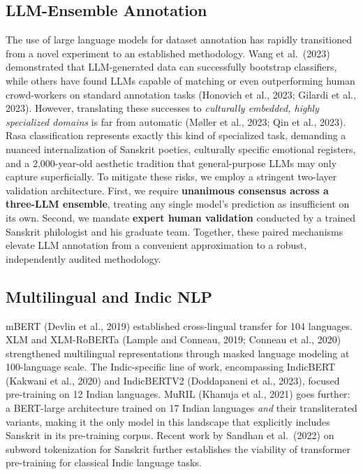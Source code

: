 \documentclass[11pt]{article}
\begin{document}
\subsection{LLM-Ensemble Annotation}

The use of large language models for dataset annotation has rapidly transitioned from a novel experiment to an established methodology. Wang et al.\ (2023) demonstrated that LLM-generated data can successfully bootstrap classifiers, while others have found LLMs capable of matching or even outperforming human crowd-workers on standard annotation tasks (Honovich et al., 2023; Gilardi et al., 2023). However, translating these successes to \emph{culturally embedded, highly specialized domains} is far from automatic (M{\o}ller et al., 2023; Qin et al., 2023). Rasa classification represents exactly this kind of specialized task, demanding a nuanced internalization of Sanskrit poetics, culturally specific emotional registers, and a 2,000-year-old aesthetic tradition that general-purpose LLMs may only capture superficially. To mitigate these risks, we employ a stringent two-layer validation architecture. First, we require \textbf{unanimous consensus across a three-LLM ensemble}, treating any single model's prediction as insufficient on its own. Second, we mandate \textbf{expert human validation} conducted by a trained Sanskrit philologist and his graduate team. Together, these paired mechanisms elevate LLM annotation from a convenient approximation to a robust, independently audited methodology.

\subsection{Multilingual and Indic NLP}

mBERT (Devlin et al., 2019) established cross-lingual transfer for 104 languages. XLM and XLM-RoBERTa (Lample and Conneau, 2019; Conneau et al., 2020) strengthened multilingual representations through masked language modeling at 100-language scale. The Indic-specific line of work, encompassing IndicBERT (Kakwani et al., 2020) and IndicBERTV2 (Doddapaneni et al., 2023), focused pre-training on 12 Indian languages. MuRIL (Khanuja et al., 2021) goes further: a BERT-large architecture trained on 17 Indian languages \emph{and} their transliterated variants, making it the only model in this landscape that explicitly includes Sanskrit in its pre-training corpus. Recent work by Sandhan et al.\ (2022) on subword tokenization for Sanskrit further establishes the viability of transformer pre-training for classical Indic language tasks.
\end{document}

